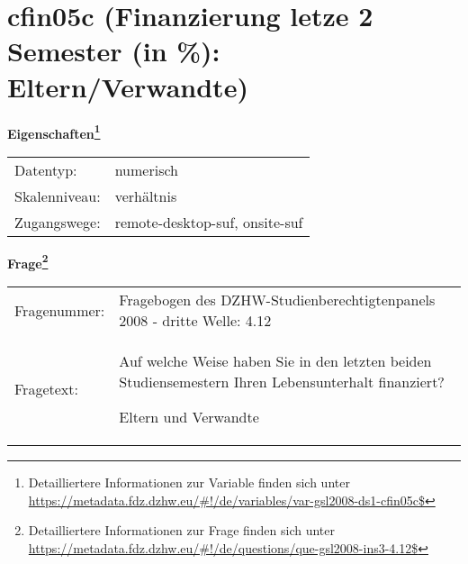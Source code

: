 
    \setcounter{footnote}{0}

    \vspace*{-1.8cm}
	\section{cfin05c (Finanzierung letze 2 Semester (in \%): Eltern/Verwandte)}
	\label{section:cfin05c}



    \vspace*{0.5cm}
    \noindent\textbf{Eigenschaften\footnote{Detailliertere Informationen zur Variable finden sich unter
		\url{https://metadata.fdz.dzhw.eu/\#!/de/variables/var-gsl2008-ds1-cfin05c$}}}\\
	\begin{tabularx}{\hsize}{@{}lX}
	Datentyp: & numerisch \\
	Skalenniveau: & verhältnis \\
	Zugangswege: &
	  remote-desktop-suf, 
	  onsite-suf
 \\
    \end{tabularx}



				\vspace*{0.5cm}
                \noindent\textbf{Frage\footnote{Detailliertere Informationen zur Frage finden sich unter
		              \url{https://metadata.fdz.dzhw.eu/\#!/de/questions/que-gsl2008-ins3-4.12$}}}\\
				\begin{tabularx}{\hsize}{@{}lX}
					Fragenummer: &
					  Fragebogen des DZHW-Studienberechtigtenpanels 2008 - dritte Welle:
					  4.12
 \\
					Fragetext: & Auf welche Weise haben Sie in den letzten beiden Studiensemestern Ihren Lebensunterhalt finanziert?\par  Eltern und Verwandte \\
				\end{tabularx}





